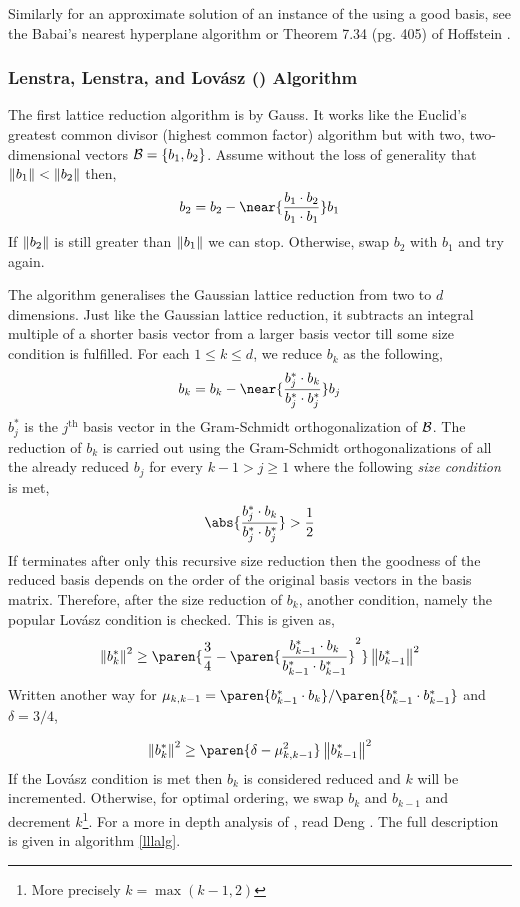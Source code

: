 \documentclass{homework}
\begin{document}
Similarly for an approximate solution of an instance of the \CVP{}
using a good basis, see the Babai's nearest hyperplane algorithm
\cite{babai1986lovasz} or Theorem 7.34 (pg. 405) of Hoffstein
\cite{hoffstein2008introduction}.

\subsubsection{Lenstra, Lenstra, and Lov\'asz (\LLL) Algorithm} The
first lattice reduction algorithm is by Gauss. It works like the
Euclid's greatest common divisor (highest common factor) algorithm but
with two, two-dimensional vectors \ie $\mathcal{B} = \{b_1, b_2\}$. Assume
without the loss of generality that $\left\lVert b_1\right\rVert < \left\lVert b_2\right\rVert$ then,
\[
  b_2 = b_2 - \near{\frac{b_1 \cdot b_2}{b_1 \cdot b_1}}b_1
\]
If $\left\lVert b_2\right\rVert$ is still greater than $\left\lVert b_1\right\rVert$ we can
stop. Otherwise, swap $b_2$ with $b_1$ and try again.

The \LLL{} algorithm generalises the Gaussian lattice reduction from
two to $d$ dimensions. Just like the Gaussian lattice reduction, it
subtracts an integral multiple of a shorter basis vector from a larger
basis vector till some size condition is fulfilled. For each
$1 \leq k \leq d$, we reduce $b_k$ as the following,
\[
  b_k = b_k - \near{\frac{b_j^* \cdot b_k}{b_j^* \cdot b_j^*}}b_j
\]
$b_j^*$ is the $j^\text{th}$ basis vector in the Gram-Schmidt
orthogonalization of $\mathcal{B}$. The reduction of $b_k$ is carried out using
the Gram-Schmidt orthogonalizations of all the already reduced $b_j$
for every $k - 1 > j \geq 1$ where the following \textit{size
  condition} is met,
\[
  \abs{\frac{b_j^* \cdot b_k}{b_j^* \cdot b_j^*}} > \frac{1}{2}
\]
If \LLL{} terminates after only this recursive size reduction then the
goodness of the reduced basis depends on the order of the original
basis vectors in the basis matrix. Therefore, after the size reduction
of $b_k$, another condition, namely the popular Lov\'asz condition is
checked. This is given as,
\[
  \norm{b_k^*}^2 \geq \paren{
    \frac{3}{4} - \paren{
      \frac{b_{k-1}^* \cdot b_k}{b_{k-1}^* \cdot b_{k-1}^*}
    }^2
  }
  \norm{b_{k-1}^*}^2
\]
Written another way for $\mu_{k, k-1} =
\paren{b_{k-1}^* \cdot b_k}/
\paren{b_{k-1}^* \cdot b_{k-1}^*}$ and $\delta = 3/4$,

\[
  \norm{b_k^*}^2 \geq \paren{\delta - \mu_{k, k-1}^2}\norm{b_{k-1}^*}^2
\]
If the Lov\'asz condition is met then $b_k$ is considered reduced and
$k$ will be incremented. Otherwise, for optimal ordering, we swap
$b_k$ and $b_{k-1}$ and decrement $k$\footnote{More precisely
  $k = \max(k - 1, 2)$}. For a more in depth analysis of \LLL{}, read
Deng \cite{deng2016introduction}. The full description is given in
algorithm \ref{lllalg}.
\end{document}

